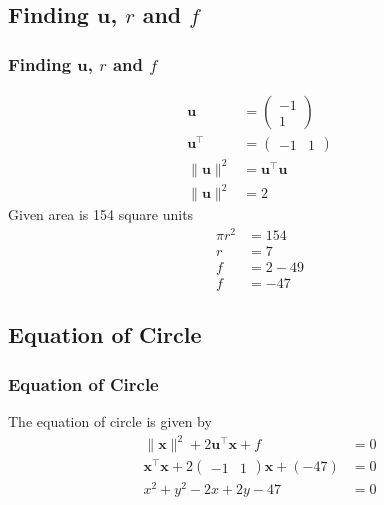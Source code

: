 \documentclass{beamer}
\theoremstyle{remark}
\newcommand{\myvec}[1]{\ensuremath{\begin{pmatrix}#1\end{pmatrix}}}
\let\vec\mathbf
\numberwithin{equation}{section}
\begin{document}
\subsection{Finding $\vec{u}$, $r$ and $f$}
\begin{frame}
\frametitle{Finding $\vec{u}$, $r$ and $f$}
\begin{align}
    \vec{u} & = \myvec{-1 \\ 1} \\
    \vec{u}^\intercal & = \myvec{-1 & 1} \\
    \lVert\vec{u}\rVert^2 & = \vec{u}^\intercal \vec{u} \\
    \lVert\vec{u}\rVert^2 & = 2
    \end{align}
    Given area is 154 square units
\begin{align}
    \pi r^2 & = 154 \\
    r & = 7 \\
    f & = 2 - 49 \\
    f & = -47
\end{align}
\end{frame}
\subsection{Equation of Circle}
\begin{frame}%
\frametitle{Equation of Circle}
The equation of circle is given by
\begin{align}
    \lVert\vec{x}\rVert^2 + 2\vec{u}^\intercal\vec{x} + f & = 0 \\
    \vec{x}^\intercal\vec{x} + 2\myvec{-1 & 1}\vec{x} + (-47) & = 0 \\
    x^2 + y^2 - 2x + 2y - 47 & = 0 \label{eq:circ_eq}
\end{align}
\end{frame}
\end{document}
